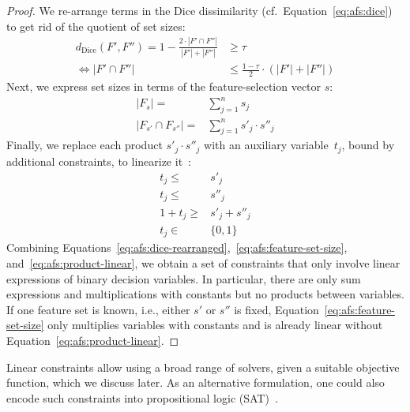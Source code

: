 \documentclass{article}
\theoremstyle{definition}
\begin{document}
\begin{proof}
We re-arrange terms in the Dice dissimilarity (cf.~Equation~\ref{eq:afs:dice}) to get rid of the quotient of set sizes:
%
\begin{equation}
	\begin{aligned}
		d_{\text{Dice}}(F',F'') = 1 - \frac{2 \cdot |F' \cap F''|}{|F'| + |F''|} &\geq \tau \\
		\Leftrightarrow |F' \cap F''| &\leq \frac{1 - \tau}{2} \cdot (|F'| + |F''|)
	\end{aligned}
	\label{eq:afs:dice-rearranged}
\end{equation}
%
Next, we express set sizes in terms of the feature-selection vector $s$:
%
\begin{equation}
	\begin{aligned}
		|F_s| =& \sum_{j=1}^n s_j \\
		|F_{s'} \cap F_{s''}| =& \sum_{j=1}^n s'_j \cdot s''_j
	\end{aligned}
	\label{eq:afs:feature-set-size}
\end{equation}
%
Finally, we replace each product $s'_j \cdot s''_j$ with an auxiliary variable~$t_j$, bound by additional constraints, to linearize it~\cite{mosek2022modeling}:
%
\begin{equation}
	\begin{aligned}
		t_j \leq& s'_j \\
		t_j \leq& s''_j \\
		1 + t_j \geq& s'_j + s''_j \\
		t_j \in& \{0,1\}
	\end{aligned}
	\label{eq:afs:product-linear}
\end{equation}
%
Combining Equations~\ref{eq:afs:dice-rearranged},~\ref{eq:afs:feature-set-size}, and~\ref{eq:afs:product-linear}, we obtain a set of constraints that only involve linear expressions of binary decision variables.
In particular, there are only sum expressions and multiplications with constants but no products between variables.
If one feature set is known, i.e., either $s'$ or $s''$ is fixed, Equation~\ref{eq:afs:feature-set-size} only multiplies variables with constants and is already linear without Equation~\ref{eq:afs:product-linear}.
\end{proof}
%
Linear constraints allow using a broad range of solvers, given a suitable objective function, which we discuss later.
As an alternative formulation, one could also encode such constraints into propositional logic (\textsc{SAT})~\cite{ulrich2022selecting}.
\end{document}
